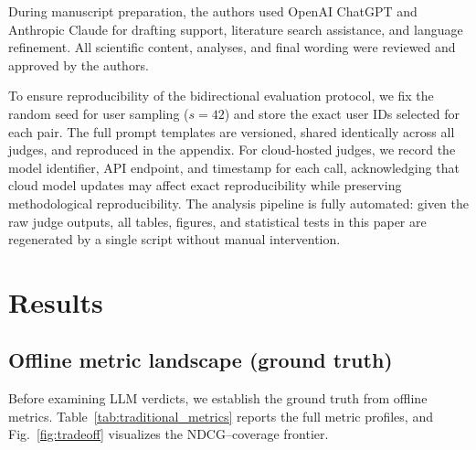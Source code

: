 \documentclass[pdflatex,sn-basic,referee,lineno]{sn-jnl}
\begin{document}
During manuscript preparation, the authors used OpenAI ChatGPT and Anthropic Claude for drafting support, literature search assistance, and language refinement. All scientific content, analyses, and final wording were reviewed and approved by the authors.

To ensure reproducibility of the bidirectional evaluation protocol, we fix the random seed for user sampling ($s = 42$) and store the exact user IDs selected for each pair. The full prompt templates are versioned, shared identically across all judges, and reproduced in the appendix. For cloud-hosted judges, we record the model identifier, API endpoint, and timestamp for each call, acknowledging that cloud model updates may affect exact reproducibility while preserving methodological reproducibility. The analysis pipeline is fully automated: given the raw judge outputs, all tables, figures, and statistical tests in this paper are regenerated by a single script without manual intervention.

\section{Results}
\label{sec:results}

\subsection{Offline metric landscape (ground truth)}

Before examining LLM verdicts, we establish the ground truth from offline metrics. Table~\ref{tab:traditional_metrics} reports the full metric profiles, and Fig.~\ref{fig:tradeoff} visualizes the NDCG--coverage frontier.
\end{document}
